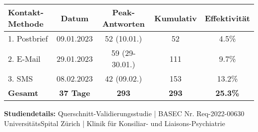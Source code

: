 \documentclass[11pt,a4paper]{article}
\begin{document}
\vspace{1cm}

\begin{center}
\begin{tabular}{|l|c|c|c|c|}
\hline
\textbf{Kontakt-Methode} & \textbf{Datum} & \textbf{Peak-Antworten} & \textbf{Kumulativ} & \textbf{Effektivität} \\
\hline
1. Postbrief & 09.01.2023 & 52 (10.01.) & 52 & 4.5\% \\
2. E-Mail & 29.01.2023 & 59 (29-30.01.) & 111 & 9.7\% \\
3. SMS & 08.02.2023 & 42 (09.02.) & 153 & 13.2\% \\
\hline
\textbf{Gesamt} & \textbf{37 Tage} & \textbf{293} & \textbf{293} & \textbf{25.3\%} \\
\hline
\end{tabular}
\end{center}

\vspace{0.5cm}

\begin{center}
\footnotesize
\textbf{Studiendetails:} Querschnitt-Validierungsstudie | BASEC Nr. Req-2022-00630\\
UniversitätsSpital Zürich | Klinik für Konsiliar- und Liaisons-Psychiatrie
\end{center}
\end{document}
